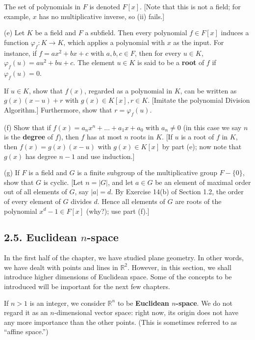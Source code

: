 \documentclass[leqno]{book}
\begin{document}
\begin{enumerate}
The set of polynomials in $F$ is denoted $F[x]$.  [Note that this is not a field; for example, $x$ has no multiplicative inverse, so (ii) fails.]

(e) Let $K$ be a field and $F$ a subfield.  Then every polynomial $f\in F[x]$ induces a function $\varphi_f:K\to K$, which applies a polynomial with $x$ as the input.  For instance, if $f=ax^2+bx+c$ with $a,b,c\in F$, then for every $u\in K$, $\varphi_f(u)=au^2+bu+c$.  The element $u\in K$ is said to be a \textbf{root} of $f$ if $\varphi_f(u)=0$.

If $u\in K$, show that $f(x)$, regarded as a polynomial in $K$, can be written as $g(x)(x-u)+r$ with $g(x)\in K[x],r\in K$.  [Imitate the polynomial Division Algorithm.]  Furthermore, show that $r=\varphi_f(u)$.

(f) Show that if $f(x)=a_nx^n+\dots+a_1x+a_0$ with $a_n\ne 0$ (in this case we say $n$ is the \textbf{degree} of $f$), then $f$ has at most $n$ roots in $K$.  [If $u$ is a root of $f$ in $K$, then $f(x)=g(x)(x-u)$ with $g(x)\in K[x]$ by part (e); now note that $g(x)$ has degree $n-1$ and use induction.]

(g) If $F$ is a field and $G$ is a finite subgroup of the multiplicative group $F-\{0\}$, show that $G$ is cyclic.  [Let $n=|G|$, and let $a\in G$ be an element of maximal order out of all elements of $G$, say $|a|=d$.  By Exercise 14(b) of Section 1.2, the order of every element of $G$ divides $d$.  Hence all elements of $G$ are roots of the polynomial $x^d-1\in F[x]$ (why?); use part (f).]
\end{enumerate}

\subsection*{2.5. Euclidean $n$-space} %
In the first half of the chapter, we have studied plane geometry.  In other words, we have dealt with points and lines in $\mathbb R^2$.  However, in this section, we shall introduce higher dimensions of Euclidean space.  Some of the concepts to be introduced will be important for the next few chapters.

If $n>1$ is an integer, we consider $\mathbb R^n$ to be \textbf{Euclidean $n$-space}.  We do not regard it as an $n$-dimensional vector space: right now, its origin does not have any more importance than the other points.  (This is sometimes referred to as ``affine space.'')
\end{document}
